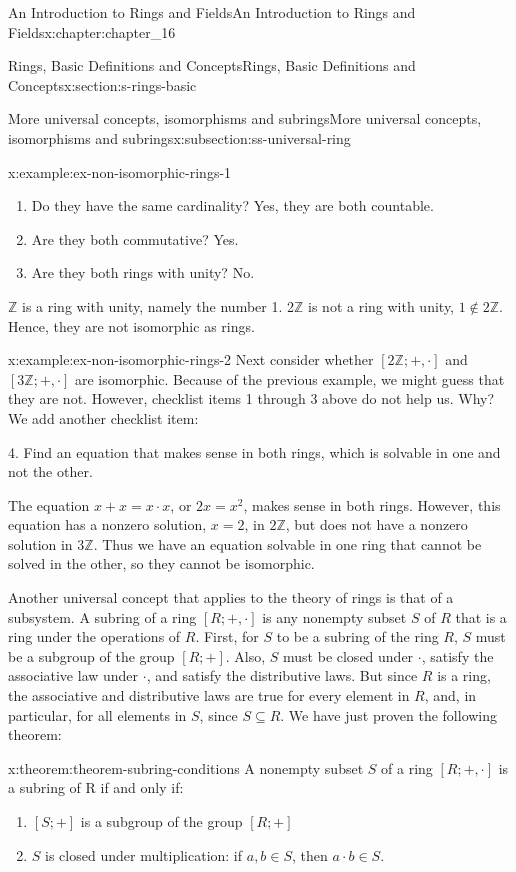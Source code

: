 \documentclass[twoside,10pt,]{book}
\numberwithin{equation}{section}
\begin{document}
\begin{chapterptx}{An Introduction to Rings and Fields}{}{An Introduction to Rings and Fields}{}{}{x:chapter:chapter_16}
\begin{sectionptx}{Rings, Basic Definitions and Concepts}{}{Rings, Basic Definitions and Concepts}{}{}{x:section:s-rings-basic}
\begin{subsectionptx}{More universal concepts, isomorphisms and subrings}{}{More universal concepts, isomorphisms and subrings}{}{}{x:subsection:ss-universal-ring}
\begin{example}{}{x:example:ex-non-isomorphic-rings-1}
\begin{enumerate}[label=(\arabic*)]
\item{}Do they have the same cardinality? Yes, they are both countable.%
\item{}Are they both commutative? Yes.%
\item{}Are they both rings with unity? No.%
\end{enumerate}
\(\mathbb{Z}\) is a ring with unity, namely the number 1.   2\(\mathbb{Z}\) is not a ring with unity, \(1\notin 2\mathbb{Z}\).  Hence, they are not isomorphic as rings.%
\end{example}
\begin{example}{}{x:example:ex-non-isomorphic-rings-2}%
Next consider whether \([2\mathbb{Z};+,\cdot]\) and \([3\mathbb{Z}; +, \cdot ]\) are isomorphic. Because of the previous example, we might  guess that they are not.   However, checklist items 1 through 3 above do not help us. Why? We add another checklist item:%
\par
4.  Find an equation that makes sense in both rings, which is solvable in one and not the other.%
\par
The equation \(x + x = x \cdot  x\),  or \(2x=x^2\), makes sense in both rings. However, this equation has a nonzero solution, \(x = 2\), in \(2\mathbb{Z}\), but does not have a nonzero solution in \(3\mathbb{Z}\). Thus we have an equation solvable in one ring that cannot be solved in the other, so they cannot be isomorphic.%
\end{example}
Another universal concept that applies to the theory of rings is that of a subsystem. A subring of a ring \([R; +, \cdot ]\) is any nonempty subset \(S\) of \(R\) that is a ring under the operations of \(R\). First, for \(S\) to be a subring of the ring \(R\), \(S\) must be a subgroup of the group \([R; +]\). Also, \(S\) must be closed under \(\cdot\), satisfy the associative law under \(\cdot\), and satisfy the distributive laws. But since \(R\) is a ring, the associative and distributive laws are true for every element in \(R\), and, in particular, for all elements in \(S\), since \(S\subseteq R\). We have just proven the following theorem:%
\begin{theorem}{}{}{x:theorem:theorem-subring-conditions}%
A nonempty subset \(S\) of a ring \([R; + , \cdot]\) is a subring of R if and only if:%
\begin{enumerate}[label=(\arabic*)]
\item{}\([S; +]\) is a subgroup of the group \([R; +]\)%
\item{}\(S\) is closed under multiplication: if \(a, b \in  S\), then \(a \cdot  b \in  S\).%

\end{enumerate}
\end{theorem}
\end{subsectionptx}
\end{sectionptx}
\end{chapterptx}
\end{document}
